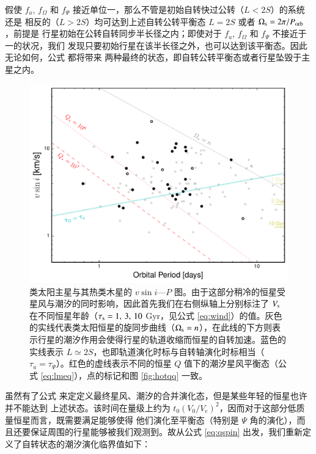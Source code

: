 假使 $f_a$, $f_\Omega$ 和 $f_\Psi$ 接近单位一，那么不管是初始自转快过公转（$L<2S$）的系统还是
相反的（$L>2S$）均可达到上述自转公转平衡态 $L=2S$ 或者 $\Omega_\mathrm{s} = 2\pi /P_\mathrm{orb}$，前提是
行星初始在公转自转同步半长径之内；即使对于 $f_a$, $f_\Omega$ 和 $f_\Psi$ 不接近于一的状况，我们
发现只要初始行星在该半长径之外，也可以达到该平衡态。因此无论如何，公式 \label{eq:lmeq} 都将带来
两种最终的状态，即自转公转平衡态或者行星坠毁于主星之内。

\begin{figure}[t]
\centering
\includegraphics[width=1.0\textwidth]{figures/chapter4/fig10a_cold.pdf}
\caption{类太阳主星与其热类木星的 $v\sin i $---$P$ 图。由于这部分稍冷的恒星受星风与潮汐的同时影响，因此首先我们在右侧纵轴上分别标注了 $V_\mathrm{s}$ 在不同恒星年龄（$\tau_\mathrm{s} = 1,\,3,\,10$ Gyr，见公式 \ref{eq:wind}）的值。灰色的实线代表类太阳恒星的旋同步曲线（$\Omega_\mathrm{s} = n$），在此线的下方则表示行星的潮汐作用会使得行星的轨道收缩而恒星的自转加速。蓝色的实线表示 $L \simeq 2S$，也即轨道演化时标与自转轴演化时标相当（$\tau_a = \tau_\Psi$）。红色的虚线表示不同的恒星 $Q$ 值下的潮汐星风平衡态（公式 \ref{eq:lmeq}），点的标记和图 \ref{fig:hotqq} 一致。}
\label{fig:coldevo}
\end{figure}

虽然有了公式 \label{eq:lmeq} 来定定义最终星风、潮汐的合并演化态，但是某些年轻的恒星也许并不能达到
上述状态。该时间在量级上约为 $t_0(V_0/V_e)^2$，因而对于这部分低质量恒星而言，既需要满足能够使得
他们演化至平衡态（特别是 $\Psi$ 角的演化），而且还要保证周围的行星能够被我们观测到。故从公式 
\ref{eq:qspin} 出发，我们重新定义了自转状态的潮汐演化临界值如下：

